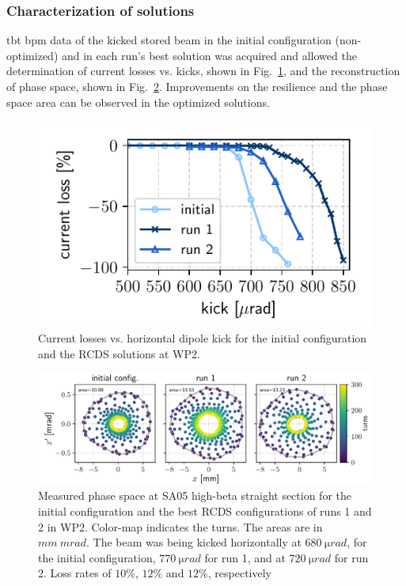 \subsubsection{Characterization of solutions}

\gls*{tbt} \gls*{bpm} data of the kicked stored beam  in the initial configuration (non-optimized) and in each run's best solution was acquired and allowed the determination of current losses vs. kicks, shown in Fig.~\ref{fig:loss_kicks_newtunes}, and the reconstruction of phase space, shown in Fig.~\ref{fig:newtunes_phase}. Improvements on the resilience and the phase space area can be observed in the optimized solutions.
\begin{figure}[tb]
    \centering
    \includegraphics[width=0.6\columnwidth]{Images/WEPL087_f3.pdf}
    \caption[Current losses vs. horizontal dipole kick for the initial configuration and the RCDS solutions at WP 2.]{Current losses vs. horizontal dipole kick for the initial configuration and the \gls*{RCDS} solutions at \gls*{WP2}.}
    \label{fig:loss_kicks_newtunes}
\end{figure}
\begin{figure}[htb]
    \includegraphics[width=\textwidth]{Images/WEPL087_f4.pdf}
    \caption[Measured phase space at SA05 high-beta straight section for the initial configuration and the best RCDS configurations of runs 1 and 2 in WP2.]{Measured phase space at SA05 high-beta straight section for the initial configuration and the best \gls*{RCDS} configurations of runs 1 and 2 in \gls*{WP2}. Color-map indicates the turns. The areas are in $\unit{mm}~\unit{mrad}$. The beam was being kicked horizontally at $680~\unit{\micro rad}$, for the initial configuration, $770~\unit{\micro rad}$ for run 1, and at $720~\unit{\micro rad}$ for run 2. Loss rates of $10\%$, $12\%$ and $12\%$, respectively}
    \label{fig:newtunes_phase}
\end{figure}

